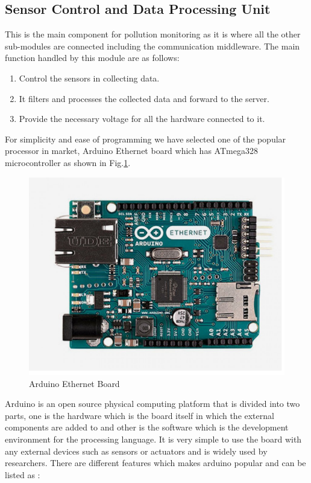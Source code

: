 \subsection{Sensor Control and Data Processing Unit}
This is the main component for pollution monitoring as it is where all the other sub-modules are connected including the communication middleware. The main function handled by this module are as follows:

\begin{enumerate}

\item Control the sensors in collecting data.
\item It filters and processes the collected data and forward to the server.
\item Provide the necessary voltage for all the hardware connected to it.

\end{enumerate}
For simplicity and ease of programming we have selected one of the popular processor in market, Arduino Ethernet board which has ATmega328 microcontroller as shown in Fig.\ref{Arduino}. 

\begin{figure}[h]
  \begin{center}
  \includegraphics[scale=0.80]{./images/figure3.png}
  \end{center}
  \caption{Arduino Ethernet Board}
  \label{Arduino}
\end{figure}

Arduino is an open source physical computing platform that is divided into two parts, one is the hardware which is the board itself in which the external components are added to and other is the software which is the development environment for the  processing language. It is very simple to use the board with any external devices such as sensors or actuators and is widely used by researchers. There are different features which makes arduino popular and can be listed as \cite{Banzi2008}:


